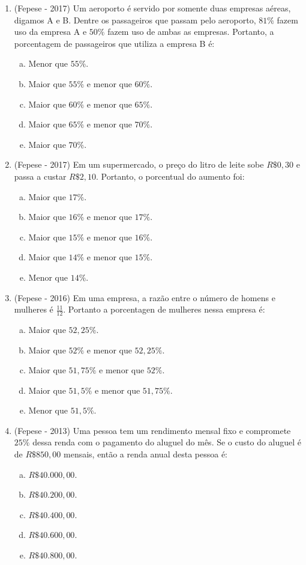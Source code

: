 \begin{enumerate}
   \item (Fepese - 2017) Um aeroporto é servido por somente duas empresas aéreas, digamos A e B. Dentre os passageiros que passam pelo aeroporto, $81\%$ fazem uso da empresa A e $50\%$ fazem uso de ambas as empresas. Portanto, a porcentagem de passageiros que utiliza a empresa B é:

  \begin{enumerate}[a)]
   \item Menor que $55\%$.
   \item Maior que $55\%$ e menor que $60\%$.
   \item Maior que $60\%$ e menor que $65\%$.
   \item Maior que $65\%$ e menor que $70\%$.
   \item Maior que $70\%$.
   \end{enumerate}
   
   \item (Fepese - 2017) Em um supermercado, o preço do litro de leite sobe $R\$ 0,30$ e passa a custar $R\$ 2,10$. Portanto, o porcentual do aumento foi:
    \begin{enumerate}[a)]
    \item Maior que $17\%$.
    \item Maior que $16\%$ e menor que $17\%$. 
    \item Maior que $15\%$ e menor que $16\%$.
    \item Maior que $14\%$ e menor que $15\%$.
    \item Menor que $14\%$. 
    \end{enumerate}
    
    \item (Fepese - 2016) Em uma empresa, a razão entre o número de homens e mulheres é $\frac{11}{12}$. Portanto a porcentagen de mulheres nessa empresa é:
    \begin{enumerate}[a)]
    \item Maior que $52,25\%$.
    \item Maior que $52\%$ e menor que $52,25\%$.
    \item Maior que $51,75\%$ e menor que $52\%$.
    \item Maior que $51,5\%$ e menor que $51,75\%$.
    \item Menor que $51,5\%$.
    \end{enumerate}
    
    \item (Fepese - 2013) Uma pessoa tem um rendimento mensal fixo e compromete $25\%$ dessa renda com o pagamento do aluguel do mês. Se o custo do aluguel é de $R\$850,00$ mensais, então a renda anual desta pessoa é:
    \begin{enumerate}[a)]
    \item $R\$ 40.000,00$.
    \item $R\$ 40.200,00$.
    \item $R\$ 40.400,00$.
    \item $R\$ 40.600,00$.
    \item $R\$ 40.800,00$.
    \end{enumerate}
    

\end{enumerate}
